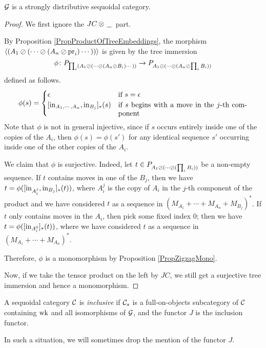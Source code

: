 \begin{proposition}
  $\mathcal G$ is a strongly distributive sequoidal category.
\end{proposition}
\begin{proof}
  We first ignore the $JC \otimes \,\underline{\hspace{1.5ex}}\,$ part.

  By Proposition \ref{PropProductOfTreeEmbeddings}, the morphism $\langle (A_1\oslash(\cdots\oslash(A_n \oslash\operatorname{pr}_i)\cdots))\rangle$ is given by the tree immersion 
  \[
    \phi\colon P_{\prod_i (A_1 \oslash(\cdots\oslash(A_n\oslash B_i)\cdots))} \to P_{A_1\oslash(\cdots\oslash(A_n\oslash \prod_iB_i))}
    \]
  defined as follows.
  \[
    \phi(s) = \begin{cases}
      \epsilon & \text{if $s=\epsilon$} \\
      [\inj_{A_1,\cdots,A_n},\inj_{B_j}]_*(s) & \parbox[t][][t]{180pt}{if $s$ begins with a move in the $j$-th component}
    \end{cases}
    \]
  Note that $\phi$ is not in general injective, since if $s$ occurs entirely inside one of the copies of the $A_i$, then $\phi(s)=\phi(s')$ for any identical sequence $s'$ occurring inside one of the other copies of the $A_i$.

  We claim that $\phi$ is surjective.  
  Indeed, let $t\in P_{A_1\oslash(\cdots \oslash(\prod_i B_i))}$ be a non-empty sequence.  
  If $t$ contains moves in one of the $B_j$, then we have $t=\phi([\operatorname{in}_{A_i^j},\operatorname{in}_{B_j}]_*(t))$, where $A_i^j$ is the copy of $A_i$ in the $j$-th component of the product and we have considered $t$ as a sequence in $(M_{A_1} + \cdots + M_{A_n} + M_{B_j})^*$.  
  If $t$ only contains moves in the $A_i$, then pick some fixed index $0$; then we have $t=\phi([\operatorname{in}_{A_i^0}]_*(t))$, where we have considered $t$ as a sequence in $(M_{A_1} + \cdots + M_{A_n})^*$.

  Therefore, $\phi$ is a monomorphism by Proposition \ref{PropZigzagMono}.

  Now, if we take the tensor product on the left by $JC$, we still get a surjective tree immersion and hence a monomorphism.
\end{proof}

\begin{definition}
  A sequoidal category ${\mathcal{C}}$ is \emph{inclusive} if ${\mathcal{C}}_s$ is a full-on-objects subcategory of ${\mathcal{C}}$ containing $\operatorname{wk}$ and all isomorphisms of $\mathcal G$, and the functor $J$ is the inclusion functor.
\end{definition}
In such a situation, we will sometimes drop the mention of the functor $J$.

